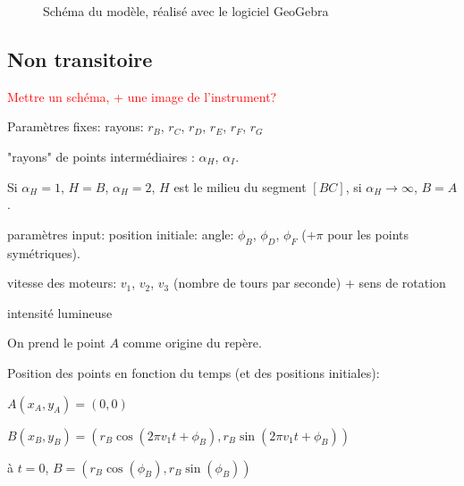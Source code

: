 \documentclass[11pt,a4paper]{article}
\newcommand{\FL}[1]{\textcolor{red}{#1}}
\begin{document}
\begin{figure}[H] 
\caption{Schéma du modèle, réalisé avec le logiciel GeoGebra}
\end{figure}


\subsection{Non transitoire}

\FL{Mettre un schéma, + une image de l'instrument?}

Paramètres fixes: 
rayons: $r_B$, $r_C$, $r_D$, $r_E$, $r_F$, $r_G$
 
"rayons" de points intermédiaires : $\alpha_H$, $\alpha_I$. 

Si $\alpha_H=1$, $H=B$, $\alpha_H=2$, $H$ est le milieu du segment $[BC]$, si $\alpha_H \rightarrow \infty$, $B=A$.


paramètres input: 
position initiale: angle: $\phi_B$, $\phi_D$, $\phi_F$
($+ \pi$ pour les points symétriques).

vitesse des moteurs: $v_1$, $v_2$, $v_3$ (nombre de tours par seconde) + sens de rotation

intensité lumineuse


On prend le point $A$ comme origine du repère.

Position des points en fonction du temps (et des positions initiales):

$A(x_A,y_A) = (0,0)$

$B(x_B,y_B) = (r_B \cos(2 \pi v_1 t + \phi_B),r_B \sin(2 \pi v_1 t + \phi_B))$

à $t=0$, $B = (r_B \cos(\phi_B), r_B \sin(\phi_B))$
\end{document}
